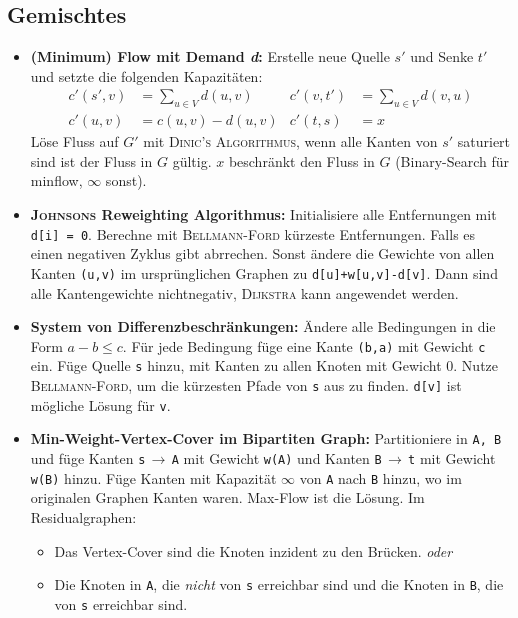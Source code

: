 \subsection{Gemischtes}
\begin{itemize}
	\item \textbf{(Minimum) Flow mit Demand \textit{d}:}
	Erstelle neue Quelle $s'$ und Senke $t'$ und setzte die folgenden Kapazitäten:
	\begin{align*}
		c'(s',v)&=\sum_{u\in{}V}d(u,v)&c'(v,t')&=\sum_{u\in{}V}d(v,u)\\[-0.5ex]
		c'(u,v)&=c(u,v)-d(u,v)&c'(t,s)&=x
	\end{align*}
	Löse Fluss auf $G'$ mit \textsc{Dinic's Algorithmus}, wenn alle Kanten von $s'$ saturiert sind ist der Fluss in $G$ gültig. $x$ beschränkt den Fluss in $G$ (Binary-Search für minflow, $\infty$ sonst).
	\item \textbf{\textsc{Johnsons} Reweighting Algorithmus:}
	Initialisiere alle Entfernungen mit \texttt{d[i] = 0}. Berechne mit \textsc{Bellmann-Ford} kürzeste Entfernungen.
	Falls es einen negativen Zyklus gibt abrrechen.
	Sonst ändere die Gewichte von allen Kanten \texttt{(u,v)} im ursprünglichen Graphen zu \texttt{d[u]+w[u,v]-d[v]}.
	Dann sind alle Kantengewichte nichtnegativ, \textsc{Dijkstra} kann angewendet werden.

	\item \textbf{System von Differenzbeschränkungen:}
	Ändere alle Bedingungen in die Form $a-b \leq c$.
	Für jede Bedingung füge eine Kante \texttt{(b,a)} mit Gewicht \texttt{c} ein.
	Füge Quelle \texttt{s} hinzu, mit Kanten zu allen Knoten mit Gewicht 0.
	Nutze \textsc{Bellmann-Ford}, um die kürzesten Pfade von \texttt{s} aus zu finden.
	\texttt{d[v]} ist mögliche Lösung für \texttt{v}.

	\item \textbf{Min-Weight-Vertex-Cover im Bipartiten Graph:}
	Partitioniere in \texttt{A, B} und füge Kanten \texttt{s}\,$\rightarrow$\,\texttt{A} mit Gewicht \texttt{w(A)} und Kanten  \texttt{B}\,$\rightarrow$\,\texttt{t} mit Gewicht \texttt{w(B)} hinzu.
	Füge Kanten mit Kapazität $\infty$ von \texttt{A} nach \texttt{B} hinzu, wo im originalen Graphen Kanten waren.
	Max-Flow ist die Lösung.\newline
	Im Residualgraphen:
	\begin{itemize}
		\item Das Vertex-Cover sind die Knoten inzident zu den Brücken. \emph{oder}
		\item Die Knoten in \texttt{A}, die \emph{nicht} von \texttt{s} erreichbar sind und die Knoten in \texttt{B}, die von \texttt{s} erreichbar sind.
	\end{itemize}


\end{itemize}
